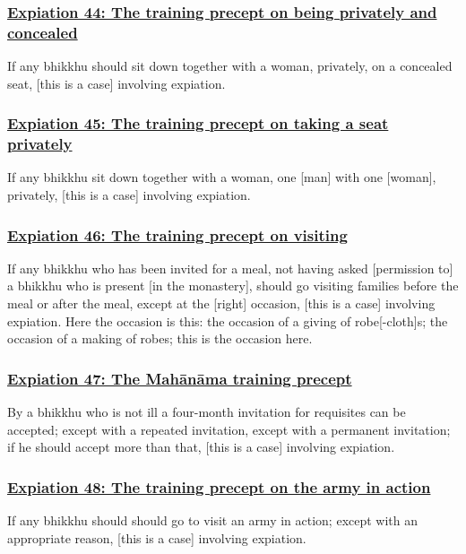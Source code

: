 \subsubsection*{\hyperref[pac44]{Expiation 44: The training precept on being privately and concealed}}
\label{exp44}
If any bhikkhu should sit down together with a woman, privately, on a concealed seat, [this is a case] involving expiation.



\subsubsection*{\hyperref[pac45]{Expiation 45: The training precept on taking a seat privately}}
\label{exp45}
If any bhikkhu sit down together with a woman, one [man] with one [woman], privately, [this is a case] involving expiation.



\subsubsection*{\hyperref[pac46]{Expiation 46: The training precept on visiting}}
\label{exp46}
If any bhikkhu who has been invited for a meal, not having asked [permission to] a bhikkhu who is present [in the monastery], should go visiting families before the meal or after the meal, except at the [right] occasion, [this is a case] involving expiation. Here the occasion is this: the occasion of a giving of robe[-cloth]s; the occasion of a making of robes; this is the occasion here.



\subsubsection*{\hyperref[pac47]{Expiation 47: The Mahānāma training precept}}
\label{exp47}
By a bhikkhu who is not ill a four-month invitation for requisites can be accepted; except with a repeated invitation, except with a permanent invitation; if he should accept more than that, [this is a case] involving expiation.



\subsubsection*{\hyperref[pac48]{Expiation 48: The training precept on the army in action}}
\label{exp48}
If any bhikkhu should should go to visit an army in action; except with an appropriate reason, [this is a case] involving expiation.



